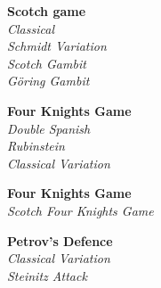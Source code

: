 \hspace{5mm}
\begin{minipage}[t]{.175\linewidth}
\begin{center}
\textbf{Scotch game}\\
\textit{Classical}\\
\textit{Schmidt Variation}\\
\textit{Scotch Gambit}\\
\textit{Göring Gambit}
\end{center}
\raggedright
\begin{center}
\phantom{\scalebox{.560}{\showboard}}
\end{center}
\vspace{10mm}
\end{minipage}
\newline
\begin{minipage}[t]{.175\linewidth}
\begin{center}
\textbf{Four Knights Game}\\
\textit{Double Spanish}\\
\textit{Rubinstein}\\
\textit{Classical Variation}
\end{center}
\raggedright
\begin{center}
\phantom{\scalebox{.560}{\showboard}}
\end{center}
\vspace{10mm}
\end{minipage}
\hspace{5mm}
\begin{minipage}[t]{.175\linewidth}
\begin{center}
\textbf{Four Knights Game}\\
\textit{Scotch Four Knights Game}
\end{center}
\raggedright
\begin{center}
\phantom{\scalebox{.560}{\showboard}}
\end{center}
\vspace{10mm}
\end{minipage}
\hspace{5mm}
\begin{minipage}[t]{.175\linewidth}
\begin{center}
\textbf{Petrov's Defence}\\
\textit{Classical Variation}\\
\textit{Steinitz Attack}
\end{center}
\raggedright
\begin{center}
\phantom{\scalebox{.560}{\showboard}}
\end{center}
\vspace{10mm}
\end{minipage}
